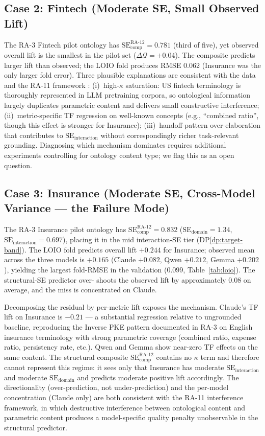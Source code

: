 \documentclass[11pt,a4paper]{article}
\newcommand{\se}{\mathrm{SE}}
\newcommand{\sedom}{\se_{\text{domain}}}
\newcommand{\seint}{\se_{\text{interaction}}}
\newcommand{\secomp}{\se_{\text{comp}}}
\newcommand{\kapp}{\kappa}
\begin{document}
\subsection{Case 2: Fintech (Moderate SE, Small Observed Lift)}

The RA-3 Fintech pilot ontology has $\secomp^{\text{RA-12}} = 0.781$
(third of five), yet observed overall lift is the smallest in the pilot
set ($\Delta \mathcal{Q} = +0.04$). The composite predicts larger lift
than observed; the LOIO fold produces RMSE 0.062 (Insurance was the
only larger fold error). Three plausible explanations are consistent
with the data and the RA-11 framework \citep{luong2026quantum}:
(i)~high-$\kapp$ saturation: US fintech terminology is thoroughly
represented in LLM pretraining corpora, so ontological information
largely duplicates parametric content and delivers small constructive
interference; (ii)~metric-specific TF regression on well-known
concepts (e.g., ``combined ratio'', though this effect is stronger for
Insurance); (iii)~handoff-pattern over-elaboration that contributes
to $\seint$ without correspondingly richer task-relevant grounding.
Diagnosing which mechanism dominates requires additional experiments
controlling for ontology content type; we flag this as an open question.

\subsection{Case 3: Insurance (Moderate SE, Cross-Model Variance — the Failure Mode)}
\label{sec:case-insurance}

The RA-3 Insurance pilot ontology has $\secomp^{\text{RA-12}} = 0.832$
($\sedom = 1.34$, $\seint = 0.697$), placing it in the mid
interaction-SE tier (DP\ref{dp:target-band}). The LOIO fold predicts
overall lift $+0.244$ for Insurance; observed mean across the three
models is $+0.165$ (Claude $+0.082$, Qwen $+0.212$, Gemma $+0.202$),
yielding the largest fold-RMSE in the validation
($0.099$, Table~\ref{tab:loio}). The structural-SE predictor over-%
shoots the observed lift by approximately $0.08$ on average, and the
miss is concentrated on Claude.

Decomposing the residual by per-metric lift exposes the mechanism.
Claude's TF lift on Insurance is $-0.21$ --- a substantial regression
relative to ungrounded baseline, reproducing the Inverse PKE pattern
documented in RA-3 \citep{luong2026neurosymbolic} on English
insurance terminology with strong parametric coverage (combined
ratio, expense ratio, persistency rate, etc.). Qwen and Gemma show
near-zero TF effects on the same content. The structural composite
$\secomp^{\text{RA-12}}$ contains no $\kapp$ term and therefore
cannot represent this regime: it sees only that Insurance has
moderate $\seint$ and moderate $\sedom$ and predicts moderate
positive lift accordingly. The directionality (over-prediction, not
under-prediction) and the per-model concentration (Claude only) are
both consistent with the RA-11 \citep{luong2026quantum} interference
framework, in which destructive interference between ontological
content and parametric content produces a model-specific quality
penalty unobservable in the structural predictor.
\end{document}
